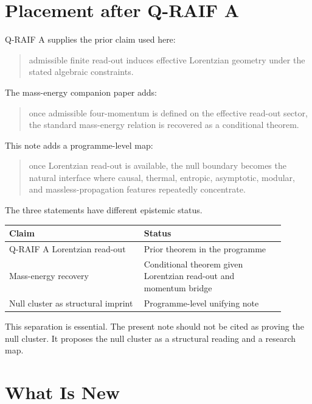 \documentclass[12pt,a4paper]{article}
\theoremstyle{definition}
\theoremstyle{remark}
\begin{document}
\section{Placement after Q-RAIF A}\label{placement-after-q-raif-a}

Q-RAIF A supplies the prior claim used here:

\begin{quote}
admissible finite read-out induces effective Lorentzian geometry under
the stated algebraic constraints.
\end{quote}

The mass-energy companion paper adds:

\begin{quote}
once admissible four-momentum is defined on the effective read-out
sector, the standard mass-energy relation is recovered as a conditional
theorem.
\end{quote}

This note adds a programme-level map:

\begin{quote}
once Lorentzian read-out is available, the null boundary becomes the
natural interface where causal, thermal, entropic, asymptotic, modular,
and massless-propagation features repeatedly concentrate.
\end{quote}

The three statements have different epistemic status.

\begin{center}
\begin{tabular}{P{0.44\linewidth}P{0.46\linewidth}}
\toprule
\textbf{Claim} & \textbf{Status} \\
\midrule
Q-RAIF A Lorentzian read-out & Prior theorem in the programme \\
Mass-energy recovery & Conditional theorem given Lorentzian read-out and momentum bridge \\
Null cluster as structural imprint & Programme-level unifying note \\
\bottomrule
\end{tabular}
\end{center}

This separation is essential. The present note should not be cited as
proving the null cluster. It proposes the null cluster as a structural
reading and a research map.

\section{What Is New}\label{what-is-new}
\end{document}
